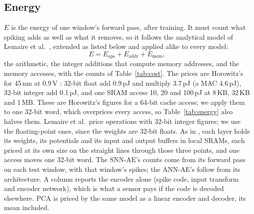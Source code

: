 \documentclass[conference]{IEEEtran}
\begin{document}
\subsection{Energy}
\label{sec:cost}
\par $E$ is the energy of one window's forward pass, after training. It must count what
spiking adds as well as what it removes, so it follows the analytical model of Lemaire et al.\
\cite{lemaire2022analytical}, extended as listed below and applied alike to every model:
\begin{equation}
  E = E_{\mathrm{ops}} + E_{\mathrm{addr}} + E_{\mathrm{mem}},
\end{equation}
the arithmetic, the integer additions that compute memory addresses, and the memory accesses,
with the counts of Table~\ref{tab:cost}. The prices are Horowitz's for 45\,nm at 0.9\,V
\cite{horowitz2014computing}: 32-bit float add 0.9\,pJ and multiply 3.7\,pJ (a MAC
4.6\,pJ), 32-bit integer add 0.1\,pJ, and one SRAM access 10, 20 and 100\,pJ at 8\,KB,
32\,KB and 1\,MB. These are Horowitz's figures for a 64-bit cache access; we apply them to one
32-bit word, which overprices every access, so Table~\ref{tab:energy} also halves them. Lemaire
et al.\ price operations with 32-bit integer figures; we use the floating-point ones, since the
weights are 32-bit floats. As in \cite{lemaire2022analytical}, each layer holds its weights, its
potentials and its input and output buffers in local SRAMs, each priced at its own size on the
straight lines through those three points, and one access moves one 32-bit word. The SNN-AE's
counts come from its forward pass on each test window, with that window's spikes; the
ANN-AE's follow from its architecture. A column reports the encoder alone (spike code, input
transform and encoder network), which is what a sensor pays if the code is decoded elsewhere.
PCA is priced by the same model as a linear encoder and decoder, its mean included.
\end{document}
